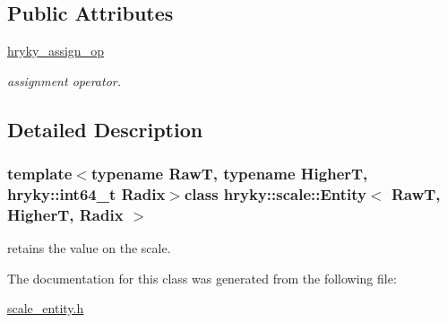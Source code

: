 \subsection*{Public Attributes}
\begin{DoxyCompactItemize}
\item 
\hypertarget{classhryky_1_1scale_1_1_entity_a498a751268cf889acf420366f1261947}{\hyperlink{classhryky_1_1scale_1_1_entity_a498a751268cf889acf420366f1261947}{hryky\-\_\-assign\-\_\-op}}\label{classhryky_1_1scale_1_1_entity_a498a751268cf889acf420366f1261947}

\begin{DoxyCompactList}\small\item\em assignment operator. \end{DoxyCompactList}\end{DoxyCompactItemize}


\subsection{Detailed Description}
\subsubsection*{template$<$typename Raw\-T, typename Higher\-T, hryky\-::int64\-\_\-t Radix$>$class hryky\-::scale\-::\-Entity$<$ Raw\-T, Higher\-T, Radix $>$}

retains the value on the scale. 

The documentation for this class was generated from the following file\-:\begin{DoxyCompactItemize}
\item 
\hyperlink{scale__entity_8h}{scale\-\_\-entity.\-h}\end{DoxyCompactItemize}
